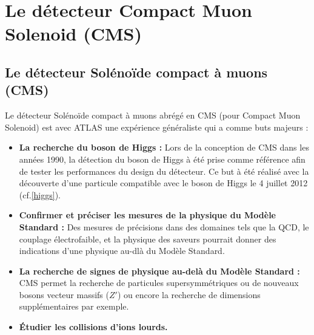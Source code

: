 \chapter{Le détecteur Compact Muon Solenoid (CMS)}
\renewcommand\chapterillustration{CMS/cms.jpeg}
\ThisULCornerWallPaper{1}{\chapterillustration}
\minitoc

\section{Le détecteur Solénoïde compact à muons (CMS)}
Le détecteur Solénoïde compact à muons abrégé en CMS (pour Compact Muon Solenoid) est avec ATLAS une expérience généraliste qui a comme buts majeurs :

\begin{itemize}[label=$\bullet$]
	\item \textbf{La recherche du boson de Higgs : } Lors de la conception de CMS dans les années 1990, la détection du boson de Higgs à été prise comme référence afin de tester les performances du design du détecteur. Ce but à été réalisé avec la découverte d'une particule compatible avec le boson de Higgs le 4 juillet 2012 (cf.\ref{higgs}).
	\item \textbf{Confirmer et préciser les mesures de la physique du Modèle Standard : } Des mesures de précisions dans des domaines tels que la QCD, le couplage électrofaible, et la physique des saveurs pourrait donner des indications d'une physique au-dlà du Modèle Standard.
	\item \textbf{La recherche de signes de physique au-delà du Modèle Standard : }CMS permet la recherche de particules supersymmétriques ou de nouveaux bosons vecteur massifs ($Z'$) ou encore la recherche de dimensions supplémentaires par exemple.
	\item \textbf{Étudier les collisions d'ions lourds.}
\end{itemize}


